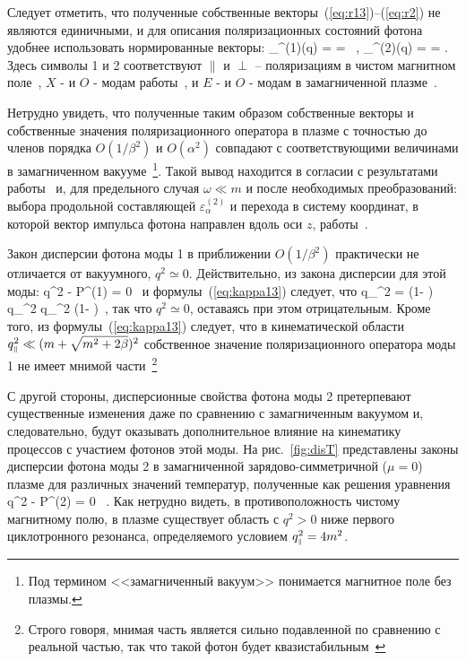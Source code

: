Следует отметить, что полученные собственные 
векторы~(\ref{eq:r13})--(\ref{eq:r2}) не являются единичными, и для описания 
поляризационных состояний фотона удобнее использовать нормированные векторы:
%
\beq
\label{eq:epsilon}
\varepsilon_\alpha^{(1)}(q) =  = 
 \, , \quad
\varepsilon_\alpha^{(2)}(q) =  = 
.
\eeq
\noindent Здесь символы 1 и 2 соответствуют  $\|$ и $\perp$ --  поляризациям в чистом магнитном поле~\cite{Adler:1971}, $X$ - и $O$ -  модам работы~\cite{Mushtukov:2016}, и $E$ - и $O$ -  модам в замагниченной плазме~\cite{Thompson:1996}. 

Нетрудно увидеть, что полученные таким образом собственные векторы и собственные значения поляризационного 
оператора в плазме с точностью до членов порядка  $O(1/\beta^2)$ и 
$O(\alpha^2)$ совпадают с соответствующими величинами в  замагниченном 
вакууме~\footnote{Под термином <<замагниченный вакуум>>  понимается магнитное 
поле без плазмы.}. Такой вывод находится в согласии с результатами 
работы~\cite{Shabad:1988} и, для предельного случая $\omega \ll m$ и после 
необходимых преобразований: выбора продольной составляющей 
$\varepsilon^{(2)}_\alpha$ и перехода в систему координат, в которой вектор 
импульса фотона направлен вдоль оси $z$, работы~\cite{Potekhin:2004}.

Закон дисперсии фотона моды 1 в приближении $O(1/\beta^2)$ практически не отличается от вакуумного, $q^2 \simeq 0$. Действительно, из закона дисперсии для этой моды:
%
\beq
q^2 - {\cal P}^{(1)} = 0 \, 
\label{disper1}
\eeq
\noindent и формулы~(\ref{eq:kappa13}) следует, что
%
\beq
q_{\mprl}^2 = \left (1- \frac{\alpha}{3\pi}  \right) \, q_{\mprp}^2  
\simeq q_{\mprp}^2 \left (1- \frac{\alpha}{3\pi} \right)\, , 
\label{disper12}
\eeq
\noindent так что $q^2 \simeq 0$, оставаясь при этом отрицательным. Кроме того, 
из формулы~(\ref{eq:kappa13}) следует, что в кинематической области 
$q^2_{\mbox{\tiny $\|$}} \ll (m+\sqrt{m^2+2 \beta})^2$ собственное значение поляризационного 
оператора моды 1 не имеет мнимой части~\footnote{Строго говоря, мнимая часть 
является сильно подавленной по сравнению с реальной частью, так что такой фотон 
будет квазистабильным~\cite{YarkovPhotDampPAN:2022}}


С другой стороны, дисперсионные свойства фотона моды 2  претерпевают 
существенные изменения даже по сравнению с замагниченным вакуумом и, 
следовательно, будут оказывать дополнительное влияние на кинематику процессов с 
участием фотонов этой моды. На рис.~\ref{fig:disT} представлены законы 
дисперсии фотона моды 2 в замагниченной зарядово-симметричной ($\mu=0$) плазме 
для различных значений температур, полученные как 
решения уравнения
%
\beq
q^2 - {\cal P}^{(2)} = 0 \, .
\label{disper}
\eeq
\noindent Как нетрудно видеть, в противоположность чистому 
магнитному полю, в плазме существует область с  $q^2 > 0$ ниже  первого  
циклотронного резонанса, определяемого условием $q^2_{\mbox{\tiny $\|$}} = 4 m^2$. 

